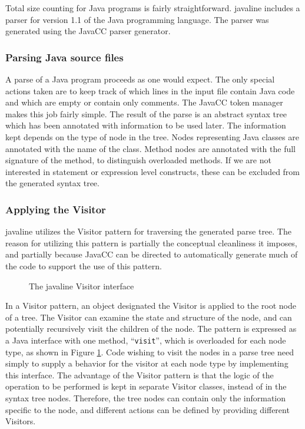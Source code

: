 Total size counting for Java programs is fairly straightforward.  {\sc javaline}
includes a parser for version 1.1 of the Java programming language.
The parser was generated using the JavaCC parser
generator\cite{javacc-website}.

\subsubsection{Parsing Java source files}

A parse of a Java program proceeds as one would expect.  The 
only special actions taken are to keep track of which lines in the
input file contain Java code and which are empty or contain only
comments.  The JavaCC token manager makes this job fairly simple.  The 
result of the parse is an abstract syntax tree which has been
annotated with information to be used later.  The information kept
depends on the type of node in the tree.  Nodes representing Java
classes are annotated with the name of the class.  Method nodes are
annotated with the full signature of the method, to distinguish
overloaded methods.  If we are not interested in statement or
expression level constructs, these can be excluded from the generated
syntax tree. 

\subsubsection{Applying the Visitor}

{\sc javaline} utilizes the Visitor pattern\cite{Gamma} for traversing the
generated parse tree.  The reason for utilizing this pattern is
partially the conceptual cleanliness it imposes, and partially because 
JavaCC can be directed to automatically generate much of the code to
support the use of this pattern.

\begin{figure}
  \centering
  
  \caption{The {\sc javaline} Visitor interface}
  \label{fig:visitor}
\end{figure}

In a Visitor pattern, an object designated the Visitor is applied to
the root node of a tree.  The Visitor can examine the state and
structure of the node, and can potentially recursively visit the
children of the node.  The pattern is expressed as 
a Java interface with one method, ``{\tt visit}'', which is overloaded for each
node type, as shown in Figure \ref{fig:visitor}. Code wishing to visit the nodes in 
a parse tree need simply to supply a behavior for the visitor at each
node type by implementing this interface.  The advantage of the Visitor
pattern is that the logic of the operation to be performed is kept in
separate Visitor classes, instead of in the syntax tree nodes.  Therefore,
the tree nodes can contain only the information specific to the node, and
different actions can be defined by providing different Visitors.  

